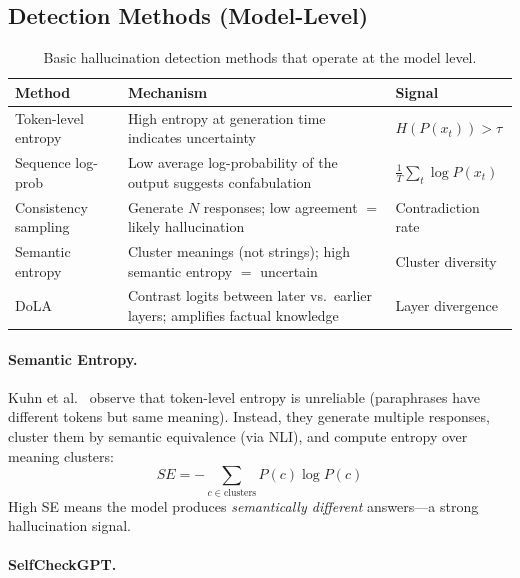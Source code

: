 \subsection{Detection Methods (Model-Level)}
\label{detection-methods-model-level}

\begin{table}[ht!]
\centering
\caption{Basic hallucination detection methods that operate at the model level.}
\begin{tabular}{@{}lp{6.5cm}l@{}}
\toprule
\textbf{Method} & \textbf{Mechanism} & \textbf{Signal} \\
\midrule
Token-level entropy & High entropy at generation time indicates uncertainty~\cite{kadavath2022language} & $H(P(x_t)) > \tau$ \\
Sequence log-prob & Low average log-probability of the output suggests confabulation & $\frac{1}{T}\sum_t \log P(x_t)$ \\
Consistency sampling & Generate $N$ responses; low agreement $=$ likely hallucination~\cite{manakul2023selfcheckgpt} & Contradiction rate \\
Semantic entropy & Cluster meanings (not strings); high semantic entropy $=$ uncertain~\cite{kuhn2023semantic} & Cluster diversity \\
DoLA & Contrast logits between later vs.~earlier layers; amplifies factual knowledge~\cite{chuang2024dola} & Layer divergence \\
\bottomrule
\end{tabular}
\end{table}

\paragraph{Semantic Entropy.}
\label{semantic-entropy.}

Kuhn et al.~\cite{kuhn2023semantic} observe that token-level entropy is unreliable (paraphrases have different tokens but same meaning). Instead, they generate multiple responses, cluster them by semantic equivalence (via NLI), and compute entropy over meaning clusters: 
\[
SE = -\sum_{c \in \text{clusters}} P(c) \log P(c)
\]
 High SE means the model produces \emph{semantically different} answers---a strong hallucination signal.

\paragraph{SelfCheckGPT.}
\label{selfcheckgpt.}

